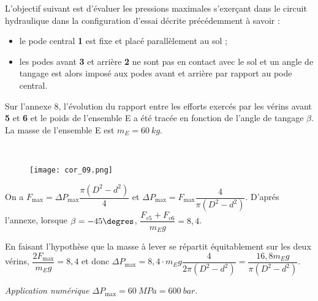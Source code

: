 L’objectif suivant est d’évaluer les pressions maximales s’exerçant dans le circuit hydraulique dans la configuration
d’essai décrite précédemment à savoir :
\begin{itemize}
\item le pode central \textbf{1} est fixe et placé parallèlement au sol ;
\item les podes avant \textbf{3} et arrière \textbf{2} ne sont pas en contact avec le sol et un angle de tangage est alors imposé aux podes avant et arrière par rapport au pode central.
\end{itemize}
Sur l’annexe 8, l’évolution du rapport entre les efforts exercés par les vérins avant \textbf{5} et \textbf{6} et le poids de l’ensemble E a été tracée en fonction de l’angle de tangage $\beta$. La masse de l’ensemble E est $m_E = \SI{60}{kg}$.

\ifprof
\begin{corrige}~\\
\begin{figure}[H]
\centering
\texttt{[image: cor\_09.png]}
\end{figure}
 
 On a $F_{\text{max}}=\Delta P_{\text{max}}\dfrac{\pi\left( D^2-d^2\right)}{4}$ et 
 $\Delta P_{\text{max}} = F_{\text{max}} \dfrac{4}{\pi\left( D^2-d^2\right)}$.
 D'aprés l'annexe, lorsque $\beta = -45\degres$, $\dfrac{F_{v5}+F_{v6}}{m_E g}=8,4$.
 
 En faisant l'hypothèse que la masse à lever se répartit équitablement sur les deux vérins, 
 $\dfrac{2F_{\text{max}}}{m_E g}=8,4$ et donc 
 $\Delta P_{\text{max}} = 8,4\cdot m_E g \dfrac{4}{2\pi\left( D^2-d^2\right)}=  \dfrac{16,8 m_E g}{\pi\left( D^2-d^2\right)}$.
 
 
 \textit{Application numérique }
  $\Delta P_{\text{max}} = \SI{60}{MPa} = \SI{600}{bar}$.
%


\end{corrige}



